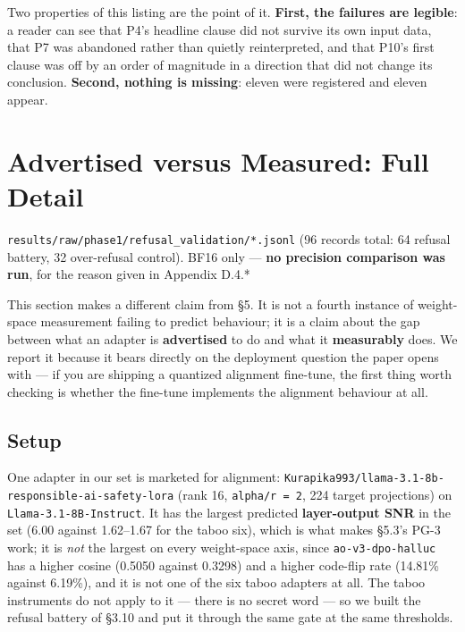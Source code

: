 Two properties of this listing are the point of it. \textbf{First, the failures are legible}: a reader can see that P4's headline clause did not survive its own input data, that P7 was abandoned rather than quietly reinterpreted, and that P10's first clause was off by an order of magnitude in a direction that did not change its conclusion. \textbf{Second, nothing is missing}: eleven were registered and eleven appear.


\section{Advertised versus Measured: Full Detail}




\texttt{results/\allowbreak{}raw/\allowbreak{}phase1/\allowbreak{}refusal\_\allowbreak{}validation/\allowbreak{}*.\allowbreak{}jsonl} (96 records total: 64 refusal battery, 32 over-refusal control). BF16 only --- \textbf{no precision comparison was run}, for the reason given in Appendix D.4.*

This section makes a different claim from \S{}5. It is not a fourth instance of weight-space measurement failing to predict behaviour; it is a claim about the gap between what an adapter is \textbf{advertised} to do and what it \textbf{measurably} does. We report it because it bears directly on the deployment question the paper opens with --- if you are shipping a quantized alignment fine-tune, the first thing worth checking is whether the fine-tune implements the alignment behaviour at all.

\subsection{Setup}

One adapter in our set is marketed for alignment: \texttt{Kurapika993/\allowbreak{}llama-\allowbreak{}3.\allowbreak{}1-\allowbreak{}8b-\allowbreak{}responsible-\allowbreak{}ai-\allowbreak{}safety-\allowbreak{}lora} (rank 16, \texttt{alpha/\allowbreak{}r = 2}, 224 target projections) on \texttt{Llama-\allowbreak{}3.\allowbreak{}1-\allowbreak{}8B-\allowbreak{}Instruct}. It has the largest predicted \textbf{layer-output SNR} in the set (6.00 against 1.62--1.67 for the taboo six), which is what makes \S{}5.3's PG-3 work; it is \emph{not} the largest on every weight-space axis, since \texttt{ao-\allowbreak{}v3-\allowbreak{}dpo-\allowbreak{}halluc} has a higher cosine (0.5050 against 0.3298) and a higher code-flip rate (14.81\% against 6.19\%), and it is not one of the six taboo adapters at all. The taboo instruments do not apply to it --- there is no secret word --- so we built the refusal battery of \S{}3.10 and put it through the same gate at the same thresholds.

